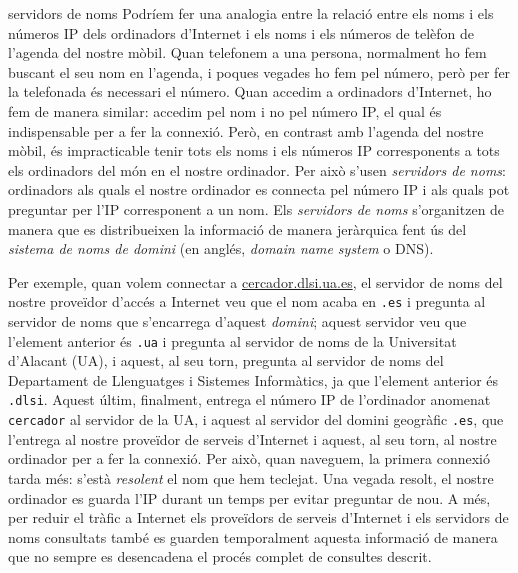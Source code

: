 \begin{persabermes}{servidors de noms}
  Podríem fer una analogia entre la relació entre els noms i els
  números IP dels ordinadors d'Internet i els noms i els números de
  telèfon de l'agenda del nostre mòbil. Quan telefonem a una persona,
  normalment ho fem buscant el seu nom en l'agenda, i poques vegades
  ho fem pel número, però per fer la telefonada és necessari el
  número. Quan accedim a ordinadors d'Internet, ho fem de manera
  similar: accedim pel nom i no pel número IP, el qual és
  indispensable per a fer la connexió. Però, en contrast amb l'agenda
  del nostre mòbil, és impracticable tenir tots els noms i els números
  IP corresponents a tots els ordinadors del món en el nostre
  ordinador. Per això s'usen \emph{servidors de noms}: ordinadors als
  quals el nostre ordinador es connecta pel número IP i als quals pot
  preguntar per l'IP corresponent a un nom. Els \emph{servidors de
    noms} s'organitzen de manera que es distribueixen la informació de
  manera jeràrquica fent ús del \emph{sistema de noms de domini} (en
  anglés, \emph{domain name system} o DNS). 

  Per exemple, quan volem connectar a \url{cercador.dlsi.ua.es}, el
  servidor de noms del nostre proveïdor d'accés a Internet veu que el
  nom acaba en \texttt{.es} i pregunta al servidor de noms que
  s'encarrega d'aquest \emph{domini}; aquest servidor veu que
  l'element anterior és \texttt{.ua} i pregunta al servidor de noms de
  la Universitat d'Alacant (UA), i aquest, al seu torn, pregunta al
  servidor de noms del Departament de Llenguatges i Sistemes
  Informàtics, ja que l'element anterior és \texttt{.dlsi}. Aquest
  últim, finalment, entrega el número IP de l'ordinador anomenat
  \texttt{cercador} al servidor de la UA, i aquest al servidor del
  domini geogràfic \texttt{.es}, que l'entrega al nostre proveïdor de
  serveis d'Internet i aquest, al seu torn, al nostre ordinador per a
  fer la connexió. Per això, quan naveguem, la primera connexió tarda
  més: s'està \emph{resolent} el nom que hem teclejat. Una vegada
  resolt, el nostre ordinador es guarda l'IP durant un temps per
  evitar preguntar de nou. A més, per reduir el tràfic a Internet els
  proveïdors de serveis d'Internet i els servidors de noms consultats
  també es guarden temporalment aquesta informació de manera que no
  sempre es desencadena el procés complet de consultes descrit.
\end{persabermes}

